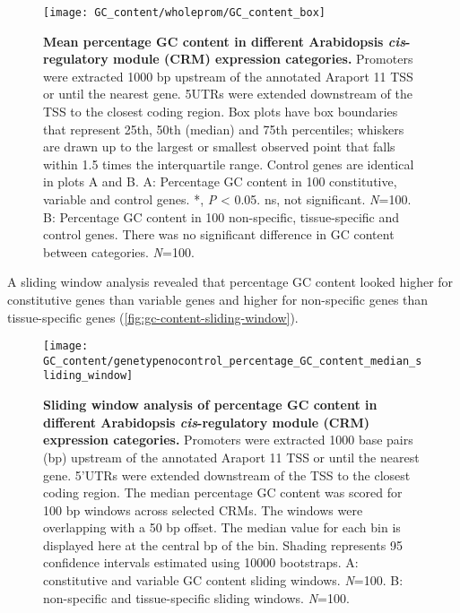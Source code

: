 \documentclass[../main.tex]{subfiles}
\begin{document}
{{\begin{figure}[hbt!]
	\begin{center}
		\capstart
		\texttt{[image: GC\_content/wholeprom/GC\_content\_box]}
		\caption{
			\textbf{Mean percentage GC content in different Arabidopsis \textit{cis}\hyp{}regulatory module (CRM) expression categories.}
			Promoters were extracted 1000 bp upstream of the annotated Araport 11 \autocite{chengAraport11CompleteReannotation2017} TSS or until the nearest gene.
			5UTRs were extended downstream of the TSS to the closest coding region.  Box plots have box boundaries that represent 25th, 50th (median) and 75th percentiles; whiskers are drawn up to the largest or smallest observed point that falls within 1.5 times the interquartile range.
			Control genes are identical in plots A and B.
			A: Percentage GC content in 100 constitutive, variable and control genes. *, \textit{P} \textless{} 0.05. ns, not significant. \textit{N}=100.
			B: Percentage GC content in 100 non\hyp{}specific, tissue\hyp{}specific and control genes. There was no significant difference in GC content between categories. \textit{N}=100.
			\label{fig:gc-content-wholeprom}
		}
	\end{center}
\end{figure}

A sliding window analysis revealed that percentage GC content looked higher for constitutive genes than variable genes and higher for non\hyp{}specific genes than tissue\hyp{}specific genes (\autoref{fig:gc-content-sliding-window}).

\begin{figure}[hbt!]
	\begin{center}
		\capstart
		\texttt{[image: GC\_content/genetypenocontrol\_percentage\_GC\_content\_median\_sliding\_window]}
		\caption{
			\textbf{Sliding window analysis of percentage GC content in different Arabidopsis \textit{cis}\hyp{}regulatory module (CRM) expression categories.}
			Promoters were extracted 1000 base pairs (bp) upstream of the annotated Araport 11 \autocite{chengAraport11CompleteReannotation2017} TSS or until the nearest gene.
			5'UTRs were extended downstream of the TSS to the closest coding region.
			The median percentage GC content was scored for 100 bp windows across selected CRMs.
			The windows were overlapping with a 50 bp offset.
			The median value for each bin is displayed here at the central bp of the bin.
			Shading represents 95 confidence intervals estimated using 10000 bootstraps.
			A: constitutive and variable GC content sliding windows. \textit{N}=100.
			B: non\hyp{}specific and tissue\hyp{}specific sliding windows. \textit{N}=100.
			\label{fig:gc-content-sliding-window}
		}
	\end{center}
\end{figure}

}}
\end{document}
